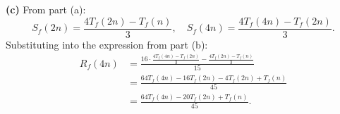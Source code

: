 \documentclass[reqno]{exam}
\begin{document}
\begin{questions}
\begin{solution}
    \textbf{(c)} From part (a):
    $$S_f(2n) = \frac{4T_f(2n) - T_f(n)}{3}, \quad S_f(4n) = \frac{4T_f(4n) - T_f(2n)}{3}.$$
    Substituting into the expression from part (b):
    \begin{align*}
      R_f(4n) & = \frac{16 \cdot \frac{4T_f(4n) - T_f(2n)}{3} - \frac{4T_f(2n) - T_f(n)}{3}}{15} \\
              & = \frac{64T_f(4n) - 16T_f(2n) - 4T_f(2n) + T_f(n)}{45}                           \\
              & = \frac{64T_f(4n) - 20T_f(2n) + T_f(n)}{45}.
    \end{align*}
  \end{solution}

\end{questions}
\end{document}
